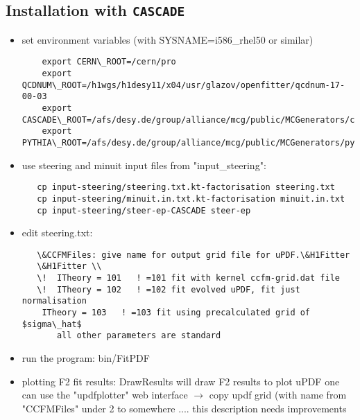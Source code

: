\documentclass[11pt,a4paper]{article}
\begin{document}
\subsection{Installation with {\tt CASCADE}}

\begin{itemize}

\item  set environment variables (with {SYSNAME=i586\_rhel50} or similar)
    
\begin{verbatim}
    export CERN\_ROOT=/cern/pro  
    export QCDNUM\_ROOT=/h1wgs/h1desy11/x04/usr/glazov/openfitter/qcdnum-17-00-03
    export CASCADE\_ROOT=/afs/desy.de/group/alliance/mcg/public/MCGenerators/cascade/2.2.04/\$SYSNAME 
    export PYTHIA\_ROOT=/afs/desy.de/group/alliance/mcg/public/MCGenerators/pythia6/425/\$SYSNAME}
    \end{verbatim}	

\item use steering and minuit input files from "input\_steering": 

   \begin{verbatim} 
   cp input-steering/steering.txt.kt-factorisation steering.txt 
   cp input-steering/minuit.in.txt.kt-factorisation minuit.in.txt 
   cp input-steering/steer-ep-CASCADE steer-ep 
   \end{verbatim}

\item  edit steering.txt: 
 \begin{verbatim}
   \&CCFMFiles: give name for output grid file for uPDF.\&H1Fitter 
   \&H1Fitter \\ 
   \!  ITheory = 101   ! =101 fit with kernel ccfm-grid.dat file 
   \!  ITheory = 102   ! =102 fit evolved uPDF, fit just normalisation 
    ITheory = 103   ! =103 fit using precalculated grid of $sigma\_hat$
       all other parameters are standard
  \end{verbatim}

\item run the program: bin/FitPDF 
   
\item plotting F2 fit results:
   DrawResults \! will draw F2 results to plot uPDF one can use the "updfplotter" web interface $\to$ copy updf grid (with name from "CCFMFiles" under 2 to somewhere .... this description needs improvements
\end{itemize}

\end{document}
